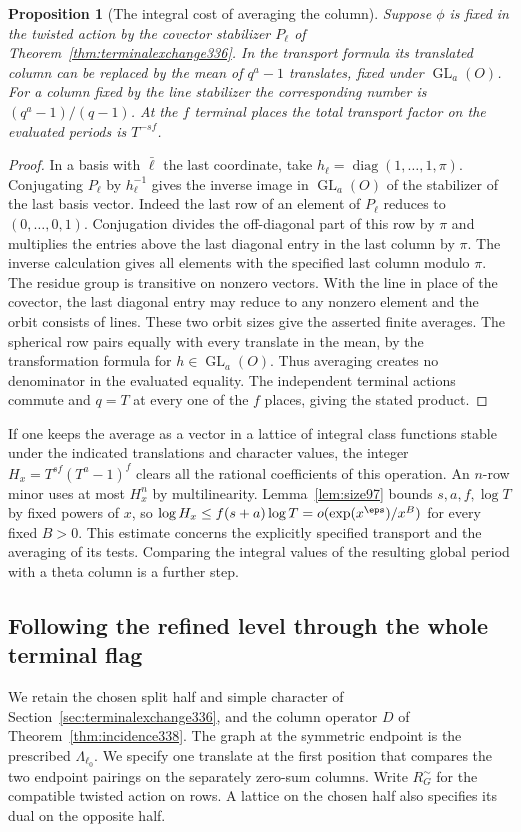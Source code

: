 \documentclass[a4paper,11pt]{article}
\newtheorem{proposition}{Proposition}[section]
\theoremstyle{definition}
\theoremstyle{remark}
\numberwithin{equation}{section}
\newcommand{\GL}{\operatorname{GL}}
\begin{document}
\begin{proposition}[The integral cost of averaging the column]\label{prop:columntrace337}
Suppose \(\phi\) is fixed in the twisted action by the covector
stabilizer \(P_\ell\) of Theorem~\ref{thm:terminalexchange336}.
In the transport formula its translated column can be replaced by
the mean of \(q^a-1\) translates, fixed under \(\GL_a(O)\).
For a column fixed by the line stabilizer the corresponding number
is \((q^a-1)/(q-1)\). At the \(f\) terminal places the total
transport factor on the evaluated periods is \(T^{-sf}\).
\end{proposition}
\begin{proof}
In a basis with \(\bar\ell\) the last coordinate, take
\(h_\ell=\operatorname{diag}(1,\ldots,1,\pi)\).
Conjugating \(P_\ell\) by \(h_\ell^{-1}\) gives the inverse
image in \(\GL_a(O)\) of the stabilizer of the last basis vector.
Indeed the last row of an element of \(P_\ell\) reduces to
\((0,\ldots,0,1)\). Conjugation divides the off-diagonal part
of this row by \(\pi\) and multiplies the entries above the last
diagonal entry in the last column by \(\pi\). The inverse
calculation gives all elements with the specified last column
modulo \(\pi\). The residue group is transitive on nonzero vectors.
With the line in place of the covector, the last diagonal entry
may reduce to any nonzero element and the orbit consists of lines.
These two orbit sizes give the asserted finite averages. The
spherical row pairs equally with every translate in the mean,
by the transformation formula for \(h\in\GL_a(O)\). Thus averaging
creates no denominator in the evaluated equality. The independent
terminal actions commute and \(q=T\) at every one of the \(f\)
places, giving the stated product.
\end{proof}

If one keeps the average as a vector in a lattice of integral
class functions stable under the indicated translations and
character values, the integer \(H_x=T^{sf}(T^a-1)^f\) clears
all the rational coefficients of this operation. An \(n\)-row
minor uses at most \(H_x^n\) by multilinearity. Lemma~\ref{lem:size97}
bounds \(s,a,f,\log T\) by fixed powers of \(x\), so
\(\log H_x\le f(s+a)\log T=o(\exp(x^\eps)/x^B)\) for every fixed
\(B>0\). This estimate concerns the explicitly specified transport
and the averaging of its tests. Comparing the integral values of
the resulting global period with a theta column is a further step.


\subsection{Following the refined level through the whole terminal flag}\label{sec:terminalwalk338}
We retain the chosen split half and simple character of
Section~\ref{sec:terminalexchange336}, and the column operator \(D\)
of Theorem~\ref{thm:incidence338}. The graph at the symmetric
endpoint is the prescribed \(\Lambda_{\ell_0}\). We specify one
translate at the first position that compares the two endpoint
pairings on the separately zero-sum columns. Write \(R_G^\sim\)
for the compatible twisted action on rows. A lattice on the chosen
half also specifies its dual on the opposite half.
\end{document}

